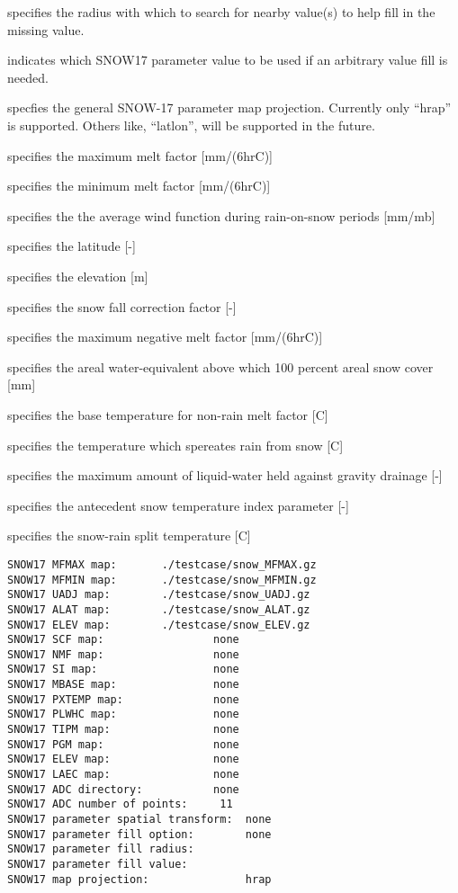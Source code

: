   specifies the radius with which
 to search for nearby value(s) to help fill in the missing value.

  indicates which  SNOW17 parameter
 value to be used if an arbitrary value fill is needed. 

  specfies the general SNOW-17 parameter
  map projection.  Currently only ``hrap'' is supported.  Others like, ``latlon'',
  will be supported in the future.

  specifies the
 maximum melt factor [mm/(6hrC)]

  specifies the
 minimum melt factor [mm/(6hrC)]

  specifies the
 the average wind function during rain-on-snow periods [mm/mb]

  specifies the
 latitude [-]

  specifies the
 elevation [m]

  specifies the
 snow fall correction factor [-]

  specifies the
 maximum negative melt factor [mm/(6hrC)]

  specifies the
 areal water-equivalent above which 100 percent areal snow cover  [mm]

  specifies the
 base temperature for non-rain melt factor [C]

  specifies the
 temperature which spereates rain from snow  [C]

  specifies the
 maximum amount of liquid-water held against gravity drainage  [-]

  specifies the
 antecedent snow temperature index parameter [-]

  specifies the
 snow-rain split temperature [C]

 
 \begin{Verbatim}[frame=single]
SNOW17 MFMAX map:       ./testcase/snow_MFMAX.gz
SNOW17 MFMIN map:       ./testcase/snow_MFMIN.gz
SNOW17 UADJ map:        ./testcase/snow_UADJ.gz
SNOW17 ALAT map:        ./testcase/snow_ALAT.gz
SNOW17 ELEV map:        ./testcase/snow_ELEV.gz
SNOW17 SCF map:                 none
SNOW17 NMF map:                 none
SNOW17 SI map:                  none
SNOW17 MBASE map:               none
SNOW17 PXTEMP map:              none
SNOW17 PLWHC map:               none
SNOW17 TIPM map:                none
SNOW17 PGM map:                 none
SNOW17 ELEV map:                none
SNOW17 LAEC map:                none
SNOW17 ADC directory:           none
SNOW17 ADC number of points:     11
SNOW17 parameter spatial transform:  none
SNOW17 parameter fill option:        none
SNOW17 parameter fill radius:
SNOW17 parameter fill value:
SNOW17 map projection:               hrap
 \end{Verbatim}

